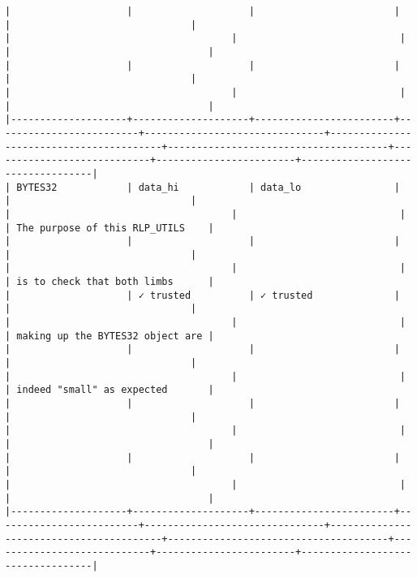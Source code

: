 \documentclass[varwidth=\maxdimen,margin=0.5cm,multi={verbatim}]{standalone}
\begin{document}
\begin{verbatim}
|                    |                    |                        |                         |                               |                                         |                                      |                            |                        |                                  |
|                    |                    |                        |                         |                               |                                         |                                      |                            |                        |                                  |
|--------------------+--------------------+------------------------+-------------------------+-------------------------------+-----------------------------------------+--------------------------------------+----------------------------+------------------------+----------------------------------|
| BYTES32            | data_hi            | data_lo                |                         |                               |                                         |                                      |                            |                        | The purpose of this RLP_UTILS    |
|                    |                    |                        |                         |                               |                                         |                                      |                            |                        | is to check that both limbs      |
|                    | ✓ trusted          | ✓ trusted              |                         |                               |                                         |                                      |                            |                        | making up the BYTES32 object are |
|                    |                    |                        |                         |                               |                                         |                                      |                            |                        | indeed "small" as expected       |
|                    |                    |                        |                         |                               |                                         |                                      |                            |                        |                                  |
|                    |                    |                        |                         |                               |                                         |                                      |                            |                        |                                  |
|--------------------+--------------------+------------------------+-------------------------+-------------------------------+-----------------------------------------+--------------------------------------+----------------------------+------------------------+----------------------------------|

\end{verbatim}
\end{document}
